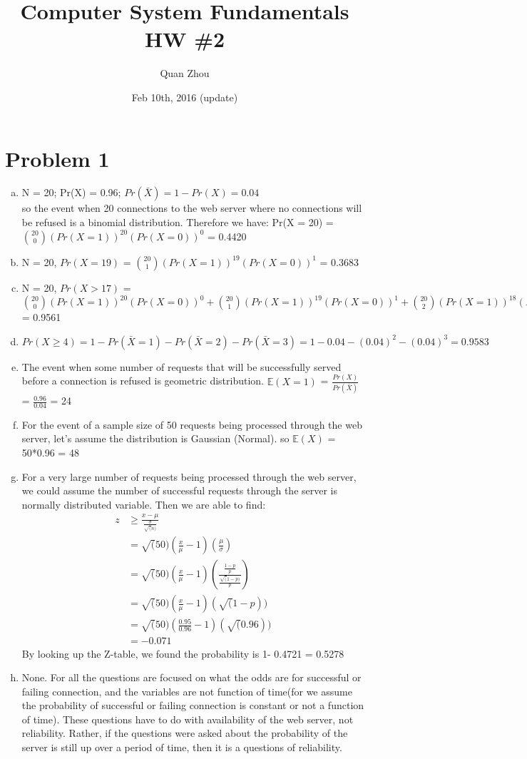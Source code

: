 \documentclass{article}   	                         %
\title{Computer System Fundamentals HW \#2}
\author{Quan Zhou}
\date{Feb 10th, 2016 (update)}
\begin{document}
\maketitle
\section*{Problem 1}
\begin{enumerate}[(a)]
\item
N = 20; Pr(X) = 0.96; $Pr(\bar X)  = 1 - Pr(X) = 0.04$\\
so the event when 20 connections to the web server where no connections will be refused is a binomial distribution. Therefore we have: Pr(X = 20) = ${20 \choose 0} (Pr(X = 1))^{20}(Pr(X = 0))^0$ = 0.4420
\item
N = 20, $Pr(X = 19)$ = ${20 \choose 1} (Pr(X = 1))^{19}(Pr(X = 0))^1$ = 0.3683
\item
N = 20, $Pr(X > 17)$ = ${20 \choose 0} (Pr(X = 1))^{20}(Pr(X = 0))^0 + {20 \choose 1} (Pr(X = 1))^{19}(Pr(X = 0))^1 + {20 \choose 2} (Pr(X = 1))^{18}(Pr(X = 0))^2 + {20 \choose 3} (Pr(X = 1))^{17}(Pr(X = 0))^3$ = 0.9561
\item
$Pr(X \geq 4) = 1 - Pr(\bar X = 1) - Pr(\bar X = 2) - Pr(\bar X = 3) = 1 - 0.04 - (0.04)^2 - (0.04)^3= 0.9583$
\item
The event when some number of requests that will be successfully served before a connection is refused is geometric distribution. 
$\mathds{E}(X = 1)$ = $\frac{Pr(X)}{Pr(\bar X)}$ = $\frac{0.96}{0.04}$ = 24
\item
For the event of a sample size of 50 requests being processed through the web server, let's assume the distribution is Gaussian (Normal). so $\mathds{E}(X)$ = 50*0.96 = 48
\item
For a very large number of requests being processed through the web server, we could assume the number of successful requests through the server is normally distributed variable. Then we are able to find:\\
\begin{align*}
 z
 &\geq \frac{x - \mu}{\frac{\sigma}{\sqrt(n)}}
 \\& = \sqrt(50)(\frac{x}{\mu} - 1)(\frac{\mu}{\sigma})
 \\& = \sqrt(50)(\frac{x}{\mu} - 1)(\frac{\frac{1-p}{p}}{\frac{\sqrt(1-p)}{p}})
 \\& = \sqrt(50)(\frac{x}{\mu} - 1)(\sqrt(1-p))
 \\& = \sqrt(50)(\frac{0.95}{0.96} - 1)(\sqrt(0.96))
 \\& = -0.071
\end{align*}
By looking up the Z-table, we found the probability is 1- 0.4721  = 0.5278
\item
None. For all the questions are focused on what the odds are for successful or failing connection, and the variables are not function of time(for we assume the probability of successful or failing connection is constant or not a function of time). These questions have to do with availability of the web server, not reliability. Rather, if the questions were asked about the probability of the server is still up over a period of time, then it is a questions of reliability.\\


\end{enumerate}
\end{document}
